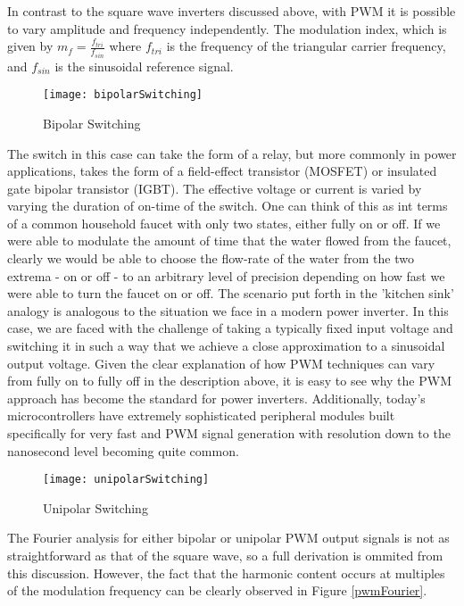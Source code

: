 In contrast to the square wave inverters discussed above, with PWM it is possible to vary amplitude and frequency independently. The modulation index, which is given by $m_f=\frac{f_{tri}}{f_{sin}}$ where $f_{tri}$ is the frequency of the triangular carrier frequency, and $f_{sin}$ is the sinusoidal reference signal. 

\begin{figure}[h]
\centering
\texttt{[image: bipolarSwitching]}
\caption{Bipolar Switching}
\label{bipolar}
\end{figure}

The switch in this case can take the form of a relay, but more commonly in power applications, takes the form of a field-effect transistor (MOSFET) or insulated gate bipolar transistor (IGBT). The effective voltage or current is varied by varying the duration of on-time of the switch. One can think of this as int terms of a common household faucet with only two states, either fully on or off. If we were able to modulate the amount of time that the water flowed from the faucet, clearly we would be able to choose the flow-rate of the water from the two extrema - on or off - to an arbitrary level of precision depending on how fast we were able to turn the faucet on or off. The scenario put forth in the 'kitchen sink' analogy is analogous to the situation we face in a modern power inverter. In this case, we are faced with the challenge of taking a typically fixed input voltage and switching it in such a way that we achieve a close approximation to a sinusoidal output voltage. Given the clear explanation of how PWM techniques can vary from fully on to fully off in the description above, it is easy to see why the PWM approach has become the standard for power inverters. Additionally, today's microcontrollers have extremely sophisticated peripheral modules built specifically for very fast and PWM signal generation with resolution down to the nanosecond level becoming quite common. 

\begin{figure}[h]
\centering
\texttt{[image: unipolarSwitching]}
\caption{Unipolar Switching}
\label{unipolar}
\end{figure}

The Fourier analysis for either bipolar or unipolar PWM output signals is not as straightforward as that of the square wave, so a full derivation is ommited from this discussion. However, the fact that the harmonic content occurs at multiples of the modulation frequency can be clearly observed in Figure \ref{pwmFourier}. 

